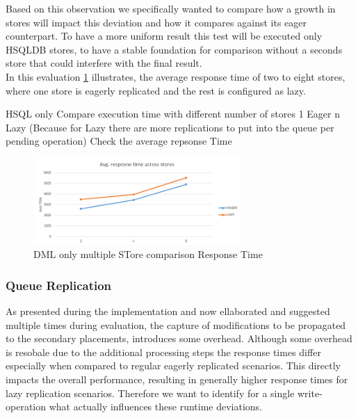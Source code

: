Based on this observation we specifically wanted to compare how a growth in stores will impact this deviation and how it compares against its eager counterpart. 
To have a more uniform result this test will be executed only HSQLDB stores, to have a stable foundation for comparison
without a seconds store that could interfere with the final result.\\
In this evaluation \ref{fig:stores_comp} illustrates, the average response time of two to eight stores, where one store is eagerly replicated and the rest
is configured as lazy.




HSQL only
Compare execution time with different number of stores 1 Eager n Lazy   
(Because for Lazy there 
are more replications to put into the queue per pending operation)
Check the average repsonse Time
\begin{figure}[t] 
    \centering 
    \includegraphics[width=0.7\textwidth]{Figures/hsql_avg_response_stores.PNG}
    \caption{DML only multiple STore comparison  Response Time}
    \label{fig:stores_comp}
\end{figure}


\subsubsection{Queue Replication}


As presented during the implementation and now ellaborated and suggested multiple times during evaluation, 
the capture of modifications to be propagated to the secondary placements, introduces some overhead. Although some overhead
is resobale due to the additional processing steps the response times differ 
especially when compared to regular eagerly replicated scenarios. This directly impacts the overall performance,
resulting in generally higher response times for lazy replication scenarios.
Therefore we want to identify for a single write-operation what actually influences these runtime deviations.



